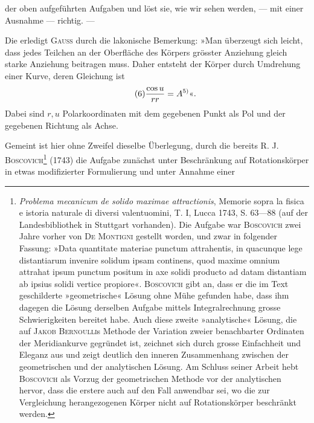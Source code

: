 der oben aufgeführten Aufgaben und löst sie, wie wir sehen werden, — mit
einer Ausnahme — richtig. —
\par\noindent\hspace*{\parindent}Die  erledigt \textsc{Gauss} durch die lakonische Bemerkung:
»Man überzeugt sich leicht, dass jedes Teilchen an der Oberfläche des Körpers
grösster Anziehung gleich starke Anziehung beitragen muss. Daher entsteht
der Körper durch Umdrehung einer Kurve, deren Gleichung ist
\begin{equation*}\tag{6}
\frac{\cos u}{rr}=A\text{\textsuperscript{5)}«}.
\end{equation*}
\setcounter{footnote}{5}
Dabei sind $r,u$ Polarkoordinaten mit dem gegebenen Punkt als Pol und der
gegebenen Richtung als Achse.
\par\noindent\hspace*{\parindent}Gemeint ist hier ohne Zweifel dieselbe Überlegung, durch die bereits
R. J. \textsc{Boscovich}\footnote{\textit{Problema mecanicum de solido maximae attractionis}, Memorie sopra la fisica e istoria naturale di
diversi valentuomini, T. I, Lucca 1743, S. 63—88 (auf der Landesbibliothek in Stuttgart vorhanden). Die
Aufgabe war \textsc{Boscovich} zwei Jahre vorher von \textsc{De Montigni} gestellt worden, und zwar in folgender
Fassung: »Data quantitate materiae punctum attrahentis, in quacunque lege distantiarum invenire solidum
ipsam continens, quod maxime omnium attrahat ipsum punctum positum in axe solidi producto ad datam
distantiam ab ipsius solidi vertice propiore«. \textsc{Boscovich} gibt an, dass er die im Text geschilderte »geometrische« Lösung ohne Mühe gefunden habe, dass ihm dagegen die Lösung derselben Aufgabe mittels
Integralrechnung grosse Schwierigkeiten bereitet habe. Auch diese zweite »analytische« Lösung, die auf
\textsc{Jakob Bernoulli}s Methode der Variation zweier benachbarter Ordinaten der Meridiankurve gegründet ist,
zeichnet sich durch grosse Einfachheit und Eleganz aus und zeigt deutlich den inneren Zusammenhang
zwischen der geometrischen und der analytischen Lösung. Am Schluss seiner Arbeit hebt \textsc{Boscovich} als
Vorzug der geometrischen Methode vor der analytischen hervor, dass die erstere auch auf den Fall anwendbar sei, wo die zur Vergleichung herangezogenen Körper nicht auf Rotationskörper beschränkt werden.} (1743) die Aufgabe zunächst unter Beschränkung auf Rotationskörper in etwas modifizierter Formulierung und unter Annahme einer
